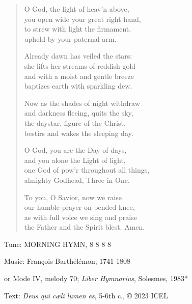 \hymn

\begin{verse}
O God, the light of heav’n above,\\
you open wide your great right hand,\\
to strew with light the firmament,\\
upheld by your paternal arm.

Already dawn has veiled the stars:\\
she lifts her streams of reddish gold\\
and with a moist and gentle breeze\\
baptizes earth with sparkling dew.

Now as the shades of night withdraw\\
and darkness fleeing, quits the sky,\\
the daystar, figure of the Christ,\\
bestirs and wakes the sleeping day.

O God, you are the Day of days,\\
and you alone the Light of light,\\
one God of pow’r throughout all things,\\
almighty Godhead, Three in One.

To you, O Savior, now we raise\\
our humble prayer on bended knee,\\
as with full voice we sing and praise\\
the Father and the Spirit blest. Amen.
\end{verse}

\begin{hymnsource}
Tune: MORNING HYMN, 8 8 8 8

Music: François Barthélémon, 1741-1808

or Mode IV, melody 70; \emph{Liber Hymnarius}, Solesmes, 1983*

Text: \emph{Deus qui cæli lumen es}, 5-6th c., © 2023 ICEL
\end{hymnsource}
